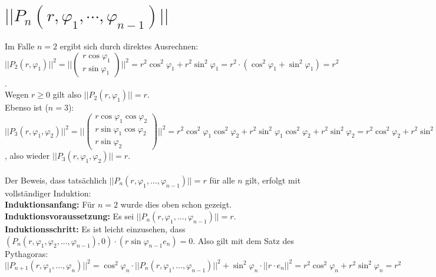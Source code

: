 \documentclass[a4paper,11pt]{report}
\theoremstyle{definition}
\begin{document}
\section{$||P_n(r,\varphi_1,\cdots,\varphi_{n-1})||$}
Im Falle $n=2$ ergibt sich durch direktes Ausrechnen:\\
$||P_2(r,\varphi_1)||^2=||\begin{pmatrix}r\cos\varphi_1\\ r\sin\varphi_1\end{pmatrix}||^2=
r^2\cos^2\varphi_1+r^2\sin^2\varphi_1=r^2\cdot(\cos^2\varphi_1+\sin^2\varphi_1)=r^2$.\\
Wegen $r\geq 0$ gilt also $||P_2(r,\varphi_1)||=r$.\\
Ebenso ist ($n=3$): $||P_3(r,\varphi_1,\varphi_2)||^2=
||\begin{pmatrix}r\cos\varphi_1\cos\varphi_2\\ r\sin\varphi_1\cos\varphi_2\\ r\sin\varphi_2\end{pmatrix}||^2=
r^2\cos^2\varphi_1\cos^2\varphi_2+r^2\sin^2\varphi_1\cos^2\varphi_2+r^2\sin^2\varphi_2
=r^2\cos^2\varphi_2+r^2\sin^2\varphi_2=r^2$, also wieder $||P_3(r,\varphi_1,\varphi_2)||=r$.\\ \\
Der Beweis, dass tatsächlich $||P_n(r,\varphi_1,\ldots,\varphi_{n-1})||=r$ für alle $n$ gilt, erfolgt mit vollständiger Induktion:\\
\textbf{Induktionsanfang:} Für $n=2$ wurde dies oben schon gezeigt. \checkmark\\
\textbf{Induktionsvoraussetzung:} Es sei $||P_n(r,\varphi_1,\ldots,\varphi_{n-1})||=r$.\\
\textbf{Induktionsschritt:} Es ist leicht einzusehen, dass $(P_n(r,\varphi_1, \varphi_2, \ldots, \varphi_{n-1}), 0)\cdot (r\sin\varphi_{n-1}e_n) = 0$. 
Also gilt mit dem Satz des Pythagoras:\\
$||P_{n+1}(r,\varphi_1,\ldots,\varphi_n)||^2=\cos^2\varphi_n\cdot||P_n(r,\varphi_1,\ldots,\varphi_{n-1})||^2 +\sin^2\varphi_n\cdot||r\cdot e_n||^2=r^2\cos^2\varphi_n+r^2\sin^2\varphi_n=r^2$ \checkmark
\end{document}
